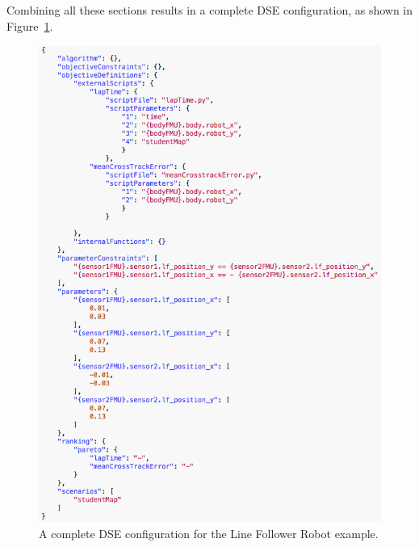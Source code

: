 Combining all these sections results in a complete DSE configuration, as shown in Figure~\ref{fig:dse:edit:whole}.
%
%
%
\begin{figure}[ht]
	\centering
	\includegraphics[scale=0.55]{figures/dse/config-whole}
		\caption{A complete DSE configuration for the Line Follower Robot example.}\label{fig:dse:edit:whole}
\end{figure}